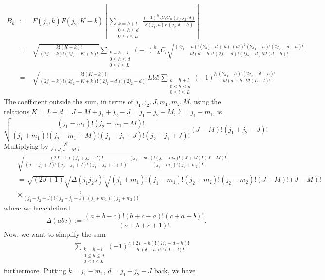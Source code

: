 \documentclass{article}
\begin{document}
{\begin{eqnarray}
B_k & := & F(j_1,k)F(j_2,K-k) \left[ \sum_{\substack{k=h+l\\0\le h \le d\\0\le l \le L}} \frac{ (-1)^h {}_LC_{l}G_h(j_1,j_2,d) }{F(j_1,h)F(j_2,d-h)}\right] \nonumber\\
 & = & \sqrt{\frac{k!(K-k)!}{(2j_1 -k)!(2j_2-K+k)!}}  \sum_{\substack{k=h+l\\0\le h \le d\\0\le l \le L}}  (-1)^h {}_LC_{l}\sqrt{\frac{(2j_1-h)!(2j_2-d+h)!(d!)^2(2j_1-h)!(2j_2-d+h)!}{h!(d-h)!(2j_1-d)!(2j_2-d)!h!(d-h)!}}  \nonumber \\
 &=& \sqrt{\frac{k!(K-k)!}{(2j_1 -k)!(2j_2-K+k)!(2j_1-d)!(2j_2-d)!}} L!d!\sum_{\substack{k=h+l\\0\le h \le d\\0\le l \le L}}  (-1)^h \frac{(2j_1-h)!(2j_2-d+h)!}{h!(d-h)!l!(L-l)!} \nonumber 
\end{eqnarray}
The coefficient outside the sum, in terms of $j_1,j_2,J,m_1,m_2,M$, using the relations $K=L+d = J- M + j_1 + j_2 -J = j_1 +j_2 -M$, $k=j_1-m_1$, is
\begin{equation}
\label{ }
\sqrt{\frac{(j_1-m_1)!(j_2+m_1 -M)!}{(j_1 + m_1)!(j_2-m_1 +M )!(j_1-j_2 +J)!(j_2-j_1 +J)!}} (J-M)!(j_1+j_2-J)!
\end{equation}
Multiplying by $\frac{N}{F(J,J-M)}$
\begin{eqnarray}
&&\sqrt{\frac{(2J+1)(j_1+j_2 -J)!}{(j_1-j_2 +J)!(j_2-j_1 +J)!(j_1+j_2+J+1)!}\frac{(j_1-m_1)!(j_2-m_2)!(J+M)!(J-M)!}{(j_1 + m_1)!(j_2+m_2 )!}} \nonumber\\
&& = \sqrt{(2J+1)}\sqrt{\Delta(j_1j_2J)}\sqrt{(j_1 + m_1)!(j_1-m_1)!(j_2+m_2 )!(j_2-m_2)!(J+M)!(J-M)!} \nonumber\\
&&\times\frac{1}{(j_1-j_2 +J)!(j_2-j_1 +J)!(j_1 + m_1)!(j_2+m_2 )!}
\end{eqnarray}
where we have defined
\begin{equation}
\label{ }
\Delta(abc) := \frac{(a+b-c)!(b+c-a)!(c+a-b)!}{(a+b+c+1)!}.
\end{equation}
Now, we want to simplify the sum
\begin{eqnarray}
&&\sum_{\substack{k=h+l\\0\le h \le d\\0\le l \le L}}  (-1)^h \frac{(2j_1-h)!(2j_2-d+h)!}{h!(d-h)!l!(L-l)!}
\end{eqnarray}
furthermore. Putting $k = j_1- m_1$, $d= j_1 + j_2 -J$ back, we have
\begin{eqnarray}

\end{eqnarray}}
\end{document}
